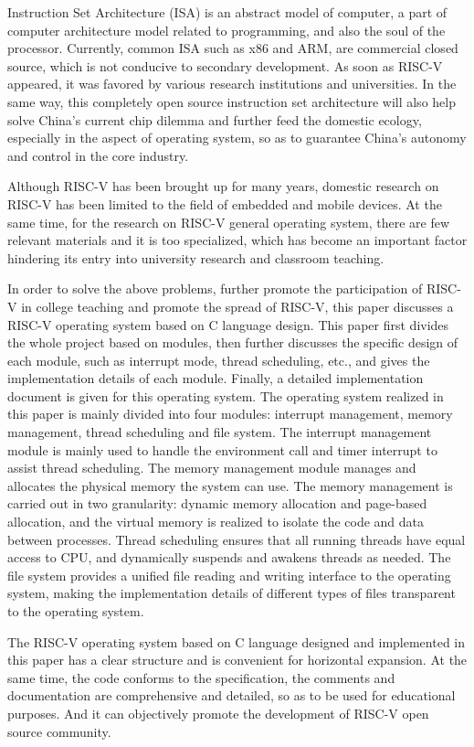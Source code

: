 \begin{eabstract}

Instruction Set Architecture (ISA) is an abstract model of computer, a part of computer architecture model related to programming, and also the soul of the processor. Currently, common ISA such as x86 and ARM, are commercial closed source, which is not conducive to secondary development. As soon as RISC-V appeared, it was favored by various research institutions and universities. In the same way, this completely open source instruction set architecture will also help solve China's current chip dilemma and further feed the domestic ecology, especially in the aspect of operating system, so as to guarantee China's autonomy and control in the core industry.

Although RISC-V has been brought up for many years, domestic research on RISC-V has been limited to the field of embedded and mobile devices. At the same time, for the research on RISC-V general operating system, there are few relevant materials and it is too specialized, which has become an important factor hindering its entry into university research and classroom teaching.

In order to solve the above problems, further promote the participation of RISC-V in college teaching and promote the spread of RISC-V, this paper discusses a RISC-V operating system based on C language design. This paper first divides the whole project based on modules, then further discusses the specific design of each module, such as interrupt mode, thread scheduling, etc., and gives the implementation details of each module. Finally, a detailed implementation document is given for this operating system. The operating system realized in this paper is mainly divided into four modules: interrupt management, memory management, thread scheduling and file system. The interrupt management module is mainly used to handle the environment call and timer interrupt to assist thread scheduling. The memory management module manages and allocates the physical memory the system can use. The memory management is carried out in two granularity: dynamic memory allocation and page-based allocation, and the virtual memory is realized to isolate the code and data between processes. Thread scheduling ensures that all running threads have equal access to CPU, and dynamically suspends and awakens threads as needed. The file system provides a unified file reading and writing interface to the operating system, making the implementation details of different types of files transparent to the operating system.

The RISC-V operating system based on C language designed and implemented in this paper has a clear structure and is convenient for horizontal expansion. At the same time, the code conforms to the specification, the comments and documentation are comprehensive and detailed, so as to be used for educational purposes. And it can objectively promote the development of RISC-V open source community.

\end{eabstract}
